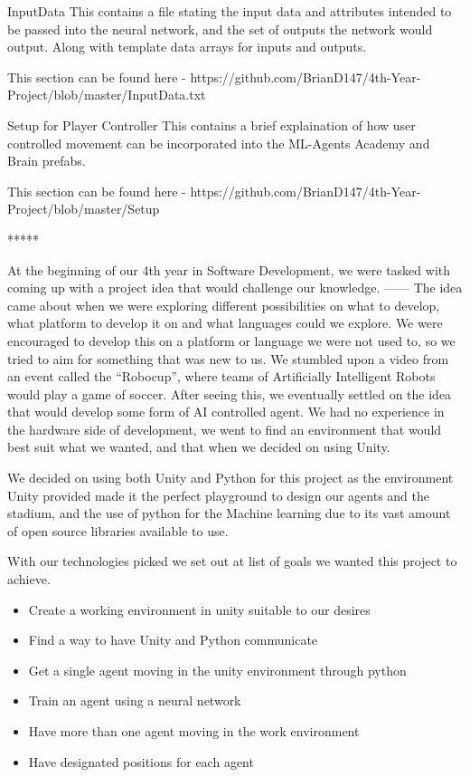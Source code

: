 InputData
This contains a file stating the input data and attributes intended to be passed into the neural network, and the set of outputs the network would output. Along with template data arrays for inputs and outputs.

This section can be found here - https://github.com/BrianD147/4th-Year-Project/blob/master/InputData.txt


Setup for Player Controller
This contains a brief explaination of how user controlled movement can be incorporated into the ML-Agents Academy and Brain prefabs.

This section can be found here - https://github.com/BrianD147/4th-Year-Project/blob/master/Setup%

*****

At the beginning of our 4th year in Software Development, we were tasked with coming up with a project idea that would challenge our knowledge. ------
The idea came about when we were exploring different possibilities on what to develop, what platform to develop it on and what languages could we explore. We were encouraged to develop this on a platform or language we were not used to, so we tried to aim for something that was new to us. We stumbled upon a video from an event called the “Robocup”, where teams of Artificially Intelligent Robots would play a game of soccer. After seeing this, we eventually settled on the idea that would develop some form of AI controlled agent. We had no experience in the hardware side of development, we went to find an environment that would best suit what we wanted, and that when we decided on using Unity.


We decided on using both Unity and Python for this project as the environment Unity provided made it the perfect playground to design our agents and the stadium, and the use of python for the Machine learning due to its vast amount of open source libraries available to use.

With our technologies picked we set out at list of goals we wanted this project to achieve. 
\begin{itemize}
  \item Create a working environment in unity suitable to our desires
  \item Find a way to have Unity and Python communicate
  \item Get a single agent moving in the unity environment through python
  \item Train an agent using a neural network
  \item Have more than one agent moving in the work environment
  \item Have designated positions for each agent
\end{itemize}

